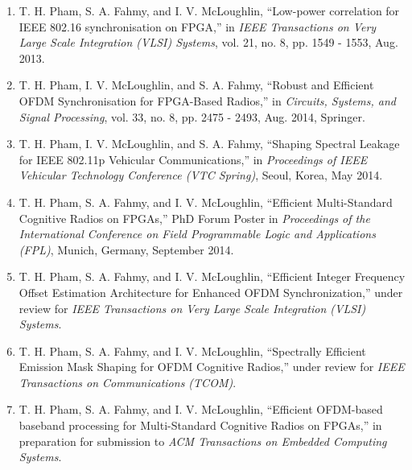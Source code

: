 \begin{enumerate}

\item  T. H. Pham, S. A. Fahmy, and I. V. McLoughlin, ``Low-power correlation for IEEE 802.16 synchronisation on FPGA,'' in \textit{IEEE Transactions on Very Large Scale Integration (VLSI) Systems}, vol. 21, no. 8, pp. 1549 - 1553, Aug. 2013.

\item T. H. Pham, I. V. McLoughlin, and S. A. Fahmy, ``Robust and Efficient OFDM Synchronisation for FPGA-Based Radios,'' in \textit{Circuits, Systems, and Signal Processing}, vol. 33, no. 8, pp. 2475 - 2493, Aug. 2014, Springer.

\item  T. H. Pham, I. V. McLoughlin, and S. A. Fahmy, ``Shaping Spectral Leakage for IEEE 802.11p Vehicular Communications,'' in \textit{Proceedings of IEEE Vehicular Technology Conference (VTC Spring)}, Seoul, Korea, May 2014.

\item T. H. Pham, S. A. Fahmy, and I. V. McLoughlin, ``Efficient Multi-Standard Cognitive Radios on FPGAs,'' PhD Forum Poster in \textit{Proceedings of the International Conference on Field Programmable Logic and Applications (FPL)}, Munich, Germany, September 2014.

\item T. H. Pham, S. A. Fahmy, and I. V. McLoughlin, ``Efficient Integer Frequency Offset Estimation Architecture for Enhanced OFDM Synchronization,'' under review for \textit{IEEE Transactions on Very Large Scale Integration (VLSI) Systems}.

\item T. H. Pham, S. A. Fahmy, and I. V. McLoughlin, ``Spectrally Efficient Emission Mask Shaping for OFDM Cognitive Radios,'' under review for \textit{IEEE Transactions on Communications (TCOM)}.

\item T. H. Pham, S. A. Fahmy, and I. V. McLoughlin, ``Efficient OFDM-based baseband processing for Multi-Standard Cognitive Radios on FPGAs,'' in preparation for submission to \emph{ACM Transactions on Embedded Computing Systems}.

\end{enumerate}